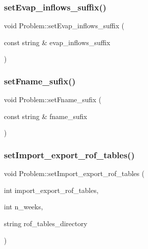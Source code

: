 \mbox{\label{classProblem_afb5e51664d0f340c393f7583622e99ca}} 
\subsubsection{\texorpdfstring{set\+Evap\+\_\+inflows\+\_\+suffix()}{setEvap\_inflows\_suffix()}}
{\footnotesize\ttfamily void Problem\+::set\+Evap\+\_\+inflows\+\_\+suffix (\begin{DoxyParamCaption}\item[{const string \&}]{evap\+\_\+inflows\+\_\+suffix }\end{DoxyParamCaption})}

\mbox{\label{classProblem_ad666ae2c231f49103593a7e03a3b58fd}} 
\subsubsection{\texorpdfstring{set\+Fname\+\_\+sufix()}{setFname\_sufix()}}
{\footnotesize\ttfamily void Problem\+::set\+Fname\+\_\+sufix (\begin{DoxyParamCaption}\item[{const string \&}]{fname\+\_\+sufix }\end{DoxyParamCaption})}

\mbox{\label{classProblem_a13b247f6699ebad04cbd5df07e681ba0}} 
\subsubsection{\texorpdfstring{set\+Import\+\_\+export\+\_\+rof\+\_\+tables()}{setImport\_export\_rof\_tables()}}
{\footnotesize\ttfamily void Problem\+::set\+Import\+\_\+export\+\_\+rof\+\_\+tables (\begin{DoxyParamCaption}\item[{int}]{import\+\_\+export\+\_\+rof\+\_\+tables,  }\item[{int}]{n\+\_\+weeks,  }\item[{string}]{rof\+\_\+tables\+\_\+directory }\end{DoxyParamCaption})}

